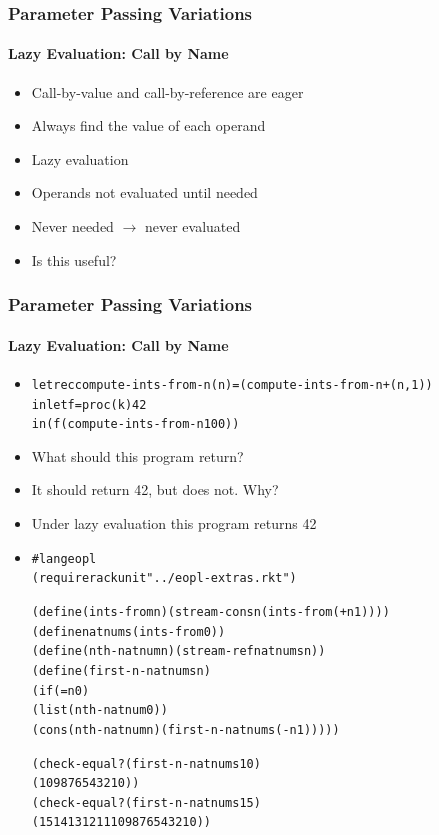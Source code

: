 \documentclass{beamer}
\newcommand{\arrow}{\(\rightarrow\)}
\newcommand{\quot}{\texttt{\textquotesingle{}}}
\begin{document}
\begin{frame}[fragile]
\frametitle{Parameter Passing Variations}
\framesubtitle{Lazy Evaluation: Call by Name}
\begin{scriptsize}
\begin{itemize}
\item<1-> Call-by-value and call-by-reference are eager

\item<1-> Always find the value of each operand

\item<2-> Lazy evaluation

\item<2-> Operands not evaluated until needed

\item<2-> Never needed \arrow{} never evaluated

\item<3-> Is this useful?


\end{itemize}
\end{scriptsize}
\end{frame}

\begin{frame}[fragile]
\frametitle{Parameter Passing Variations}
\framesubtitle{Lazy Evaluation: Call by Name}
\begin{scriptsize}
\begin{itemize}
\item<1-> 
\begin{alltt}
letrec compute-ints-from-n (n) = (compute-ints-from-n +(n, 1))
in let f = proc (k) 42
   in (f (compute-ints-from-n 100))
\end{alltt}

\item<1-> What should this program return?

\item<2-> It should return 42, but does not. Why?

\item<3-> Under lazy evaluation this program returns 42

\item<4->
\begin{alltt}
#lang eopl
(require rackunit "../eopl-extras.rkt")

(define (ints-from n) (stream-cons n (ints-from (+ n 1))))
(define natnums (ints-from 0))
(define (nth-natnum n) (stream-ref natnums n))
(define (first-n-natnums n)
  (if (= n 0)
      (list (nth-natnum 0))
      (cons (nth-natnum n) (first-n-natnums (- n 1)))))

(check-equal?  (first-n-natnums 10)
               \quot{}(10 9 8 7 6 5 4 3 2 1 0))
(check-equal?  (first-n-natnums 15)
               \quot{}(15 14 13 12 11 10 9 8 7 6 5 4 3 2 1 0))
\end{alltt}


\end{itemize}
\end{scriptsize}
\end{frame}
\end{document}
